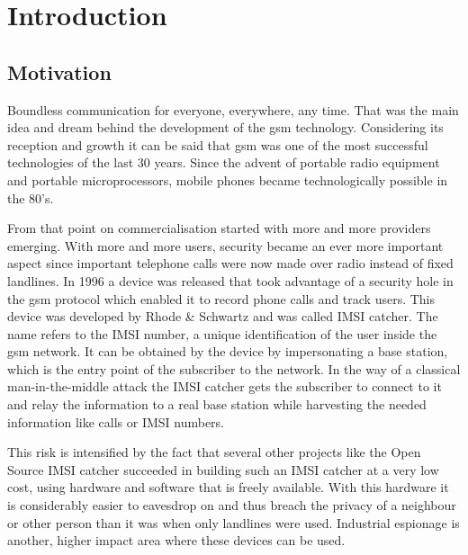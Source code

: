 \chapter{Introduction}

\section{Motivation}
Boundless communication for everyone, everywhere, any time.
That was the main idea and dream behind the development of the \gls{gsm} technology.
Considering its reception and growth \cite{GSM2009,GSM_history2011,GSM_stats2011} it can be said that \gls{gsm} was one of the most successful technologies of the last 30 years.
Since the advent of portable radio equipment and portable microprocessors, mobile phones became technologically possible in the 80's.

From that point on commercialisation started with more and more providers emerging.
With more and more users, security became an ever more important aspect since important telephone calls were now made over radio instead of fixed landlines.
In 1996 a device was released that took advantage of a security hole in the \gls{gsm} protocol which enabled it to record phone calls and track users.
This device was developed by Rhode \& Schwartz and was called IMSI catcher.
The name refers to the IMSI number, a unique identification of the user inside the \gls{gsm} network.
It can be obtained by the device by impersonating a base station, which is the entry point of the subscriber to the network.
In the way of a classical man-in-the-middle attack the IMSI catcher gets the subscriber to connect to it and relay the information to a real base station while harvesting the needed information like calls or IMSI numbers.

This risk is intensified by the fact that several other projects like the Open Source IMSI catcher \cite{dennis} succeeded in building such an IMSI catcher at a very low cost, using hardware and software that is freely available.
With this hardware it is considerably easier to eavesdrop on and thus breach the privacy of a neighbour or other person than it was when only landlines were used.
Industrial espionage is another, higher impact area where these devices can be used.

